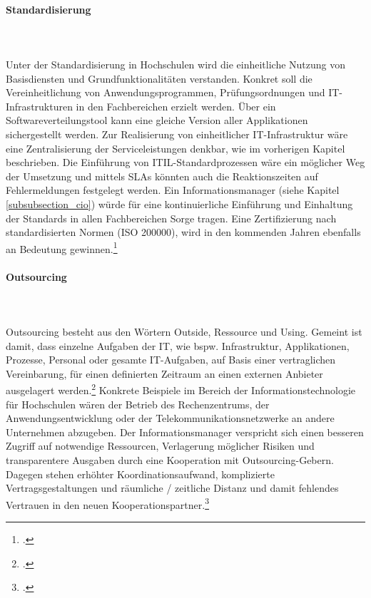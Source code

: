 \paragraph{Standardisierung}\mbox{}\\\\
Unter der Standardisierung in Hochschulen wird die einheitliche Nutzung von Basisdiensten und Grundfunktionalitäten verstanden. Konkret soll die Vereinheitlichung von Anwendungsprogrammen, Prüfungsordnungen und IT-Infrastrukturen in den Fachbereichen erzielt werden. Über ein Softwareverteilungstool kann eine gleiche Version aller Applikationen sichergestellt werden. Zur Realisierung von einheitlicher IT-Infrastruktur wäre eine Zentralisierung der Serviceleistungen denkbar, wie im vorherigen Kapitel beschrieben. Die Einführung von ITIL-Standardprozessen wäre ein möglicher Weg der Umsetzung und mittels SLAs könnten auch die Reaktionszeiten auf Fehlermeldungen festgelegt werden. Ein Informationsmanager (siehe Kapitel \ref{subsubsection_cio}) würde für eine kontinuierliche Einführung und Einhaltung der Standards in allen Fachbereichen Sorge tragen. Eine Zertifizierung nach standardisierten Normen (ISO 200000), wird in den kommenden Jahren ebenfalls an Bedeutung gewinnen.\footcite[Vgl.][168]{breiter_implementierung_2011}


\paragraph{Outsourcing}\mbox{}\\\\
Outsourcing besteht aus den Wörtern \glqq Outside\grqq{}, \glqq Ressource\grqq{} und \glqq Using\grqq{}. Gemeint ist damit, dass einzelne Aufgaben der IT, wie bspw. Infrastruktur, Applikationen, Prozesse, Personal oder gesamte IT-Aufgaben, auf Basis einer vertraglichen Vereinbarung, für einen definierten Zeitraum an einen externen Anbieter ausgelagert werden.\footcite[Vgl.][164]{krcmar_einfuhrung_2015} Konkrete Beispiele im Bereich der Informationstechnologie für Hochschulen wären der Betrieb des Rechenzentrums, der Anwendungsentwicklung oder der Telekommunikationsnetzwerke an andere Unternehmen abzugeben. Der Informationsmanager verspricht sich einen besseren Zugriff auf notwendige Ressourcen, Verlagerung möglicher Risiken und transparentere Ausgaben durch eine Kooperation mit Outsourcing-Gebern. Dagegen stehen erhöhter Koordinationsaufwand, komplizierte Vertragsgestaltungen und räumliche / zeitliche Distanz und damit fehlendes Vertrauen in den neuen Kooperationspartner.\footcite[Vgl.][195 ff.]{barthelemy_2001}

